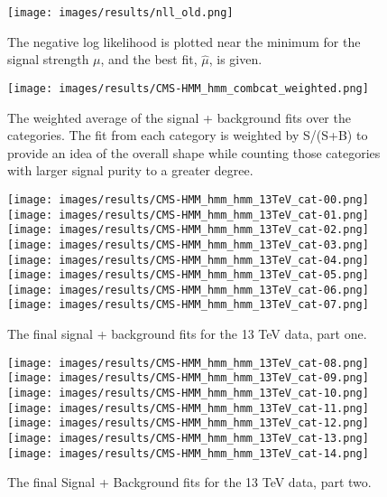 \begin{figure}[h!]
    \centering
    \texttt{[image: images/results/nll\_old.png]}
    \caption[A plot of the negative log likelihood near the minimum for the signal strength.]
    {The negative log likelihood is plotted near the minimum for the signal strength $\mu$, and the best fit, $\hat{\mu}$, is given.}
    \label{fig:signalstrength13}
\end{figure}
\begin{figure}[h!]
    \centering
    \texttt{[image: images/results/CMS-HMM\_hmm\_combcat\_weighted.png]}
    \caption[The weighted average of the signal + background fits for 13 TeV data.]
    {The weighted average of the signal + background fits over the categories. The fit from each category is weighted by S/(S+B) to provide an idea of the overall shape while counting those categories with larger signal purity to a greater degree.}
    \label{fig:splusbweight}
\end{figure}
\begin{figure}[h!]
    \centering
    \texttt{[image: images/results/CMS-HMM\_hmm\_hmm\_13TeV\_cat-00.png]}
    \texttt{[image: images/results/CMS-HMM\_hmm\_hmm\_13TeV\_cat-01.png]}
    \texttt{[image: images/results/CMS-HMM\_hmm\_hmm\_13TeV\_cat-02.png]}
    \texttt{[image: images/results/CMS-HMM\_hmm\_hmm\_13TeV\_cat-03.png]}
    \texttt{[image: images/results/CMS-HMM\_hmm\_hmm\_13TeV\_cat-04.png]}
    \texttt{[image: images/results/CMS-HMM\_hmm\_hmm\_13TeV\_cat-05.png]}
    \texttt{[image: images/results/CMS-HMM\_hmm\_hmm\_13TeV\_cat-06.png]}
    \texttt{[image: images/results/CMS-HMM\_hmm\_hmm\_13TeV\_cat-07.png]}
    \caption[Signal + background fits for the individual categories on 13 TeV data.]
    {The final signal + background fits for the 13 TeV data, part one.}
    \label{fig:fitsbycat1}
\end{figure}
\begin{figure}[h!]
    \centering
    \texttt{[image: images/results/CMS-HMM\_hmm\_hmm\_13TeV\_cat-08.png]}
    \texttt{[image: images/results/CMS-HMM\_hmm\_hmm\_13TeV\_cat-09.png]}
    \texttt{[image: images/results/CMS-HMM\_hmm\_hmm\_13TeV\_cat-10.png]}
    \texttt{[image: images/results/CMS-HMM\_hmm\_hmm\_13TeV\_cat-11.png]}
    \texttt{[image: images/results/CMS-HMM\_hmm\_hmm\_13TeV\_cat-12.png]}
    \texttt{[image: images/results/CMS-HMM\_hmm\_hmm\_13TeV\_cat-13.png]}
    \texttt{[image: images/results/CMS-HMM\_hmm\_hmm\_13TeV\_cat-14.png]}
    \caption[More signal + background fits for the individual categories on 13 TeV data.]
    {The final Signal + Background fits for the 13 TeV data, part two.}
    \label{fig:fitsbycat2}
\end{figure}
\clearpage
